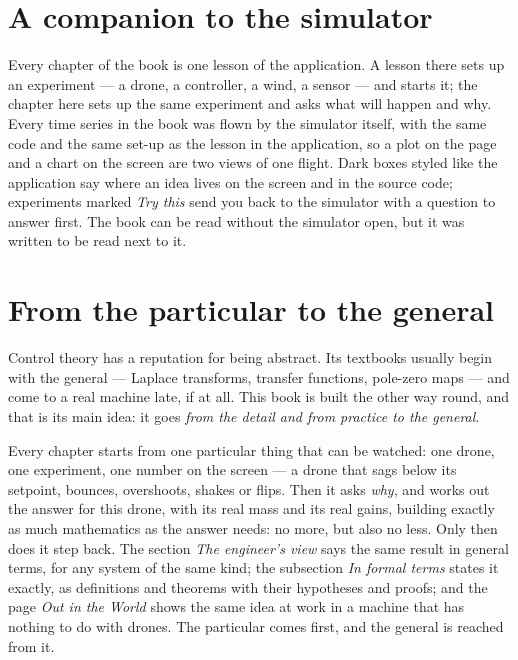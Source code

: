\label{ch:preface}


\section*{A companion to the simulator}
Every chapter of the book is one lesson of the application. A lesson there sets up an experiment — a drone, a controller, a wind, a sensor — and starts it; the chapter here sets up the same experiment and asks what will happen and why. Every time series in the book was flown by the simulator itself, with the same code and the same set-up as the lesson in the application, so a plot on the page and a chart on the screen are two views of one flight. Dark boxes styled like the application say where an idea lives on the screen and in the source code; experiments marked \emph{Try this} send you back to the simulator with a question to answer first. The book can be read without the simulator open, but it was written to be read next to it.

\section*{From the particular to the general}
Control theory has a reputation for being abstract. Its textbooks usually begin with the general — Laplace transforms, transfer functions, pole-zero maps — and come to a real machine late, if at all. This book is built the other way round, and that is its main idea: it goes \emph{from the detail and from practice to the general}.

Every chapter starts from one particular thing that can be watched: one drone, one experiment, one number on the screen — a drone that sags below its setpoint, bounces, overshoots, shakes or flips. Then it asks \emph{why}, and works out the answer for this drone, with its real mass and its real gains, building exactly as much mathematics as the answer needs: no more, but also no less. Only then does it step back. The section \emph{The engineer's view} says the same result in general terms, for any system of the same kind; the subsection \emph{In formal terms} states it exactly, as definitions and theorems with their hypotheses and proofs; and the page \emph{Out in the World} shows the same idea at work in a machine that has nothing to do with drones. The particular comes first, and the general is reached from it.

